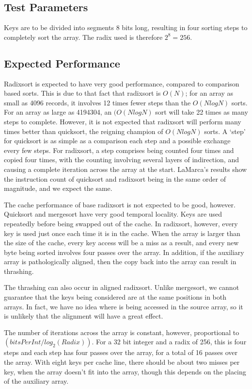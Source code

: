 \subsection{Test Parameters}
Keys are to be divided into segments 8 bits long, resulting in four sorting
steps to completely sort the array. The radix used is therefore $2^8 = 256$.

\subsection{Expected Performance}
Radixsort is expected to have very good performance, compared to comparison
based sorts. This is due to that fact that radixsort is $O(N)$; for an array as
small as 4096 records, it involves 12 times fewer steps than the $O(NlogN)$
sorts. For an array as large as 4194304, an $(O(NlogN)$ sort will take 22 times
as many steps to complete. However, it is not expected that radixsort will
perform many times better than quicksort, the reigning champion of $O(NlogN)$
sorts. A `step' for quicksort is as simple as a comparison each step and a
possible exchange every few steps.  For radixsort, a step comprises being
counted four times and copied four times, with the counting involving several
layers of indirection, and causing a complete iteration across the array at the
start. LaMarca's results show the instruction count of quicksort and radixsort
being in the same order of magnitude, and we expect the same.

The cache performance of base radixsort is not expected to be good, however.
Quicksort and mergesort have very good temporal locality. Keys are
used repeatedly before being swapped out of the cache. In radixsort, however,
every key is used just once each time it is in the cache. When the array is larger than
the size of the cache, every key access will be a miss as a result, and every
new byte being sorted involves four passes over the array. In addition, if the
auxiliary array is pathologically aligned, then the copy back into the array
can result in thrashing.

The thrashing can also occur in aligned radixsort. Unlike mergesort, we cannot
guarantee that the keys being considered are at the same positions in both
arrays. In fact, we have no idea where is being accessed in the source array, so
it is unlikely that the alignment will have a great effect.

The number of iterations across the array is constant, however, proportional to
$(bitsPerInt/log_2(Radix))$. For a 32 bit integer and a radix of 256, this is
four steps and each step has four passes over the array, for a total of 16
passes over the array.  With eight keys per cache line, there should be about
two misses per key, when the array doesn't fit into the array, though this
depends on the placing of the auxiliary array.

